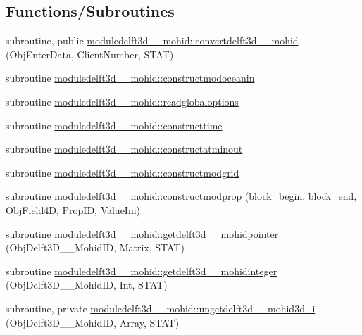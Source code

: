 \subsection*{Functions/\+Subroutines}
\begin{DoxyCompactItemize}
\item 
subroutine, public \mbox{\hyperlink{namespacemoduledelft3d__2__mohid_a03b75d6d9aec2bf65fd05cc9aaec61ab}{moduledelft3d\+\_\+\_\+mohid\+::convertdelft3d\+\_\+\_\+mohid}} (Obj\+Enter\+Data, Client\+Number, S\+T\+AT)
\item 
subroutine \mbox{\hyperlink{namespacemoduledelft3d__2__mohid_ab33b3699f757f82a3a7ef54bc7cc7061}{moduledelft3d\+\_\+\_\+mohid\+::constructmodoceanin}}
\item 
subroutine \mbox{\hyperlink{namespacemoduledelft3d__2__mohid_aa82a4835cdddf9eddf65ba75c51cff92}{moduledelft3d\+\_\+\_\+mohid\+::readglobaloptions}}
\item 
subroutine \mbox{\hyperlink{namespacemoduledelft3d__2__mohid_a6272b392fbc31727600ca81ee8fe5d43}{moduledelft3d\+\_\+\_\+mohid\+::constructtime}}
\item 
subroutine \mbox{\hyperlink{namespacemoduledelft3d__2__mohid_a7da2fd030b83e9111c17fd1699358aea}{moduledelft3d\+\_\+\_\+mohid\+::constructatminout}}
\item 
subroutine \mbox{\hyperlink{namespacemoduledelft3d__2__mohid_aff52824d2be1932406d107d88fa23498}{moduledelft3d\+\_\+\_\+mohid\+::constructmodgrid}}
\item 
subroutine \mbox{\hyperlink{namespacemoduledelft3d__2__mohid_a39e0d7490596c9b34419ca060790d641}{moduledelft3d\+\_\+\_\+mohid\+::constructmodprop}} (block\+\_\+begin, block\+\_\+end, Obj\+Field4D, Prop\+ID, Value\+Ini)
\item 
subroutine \mbox{\hyperlink{namespacemoduledelft3d__2__mohid_a13721b790965b5497115a3fa554de497}{moduledelft3d\+\_\+\_\+mohid\+::getdelft3d\+\_\+\_\+mohidpointer}} (Obj\+Delft3\+D\+\_\+\_\+\+Mohid\+ID, Matrix, S\+T\+AT)
\item 
subroutine \mbox{\hyperlink{namespacemoduledelft3d__2__mohid_a5500fdcc30972ef82a49b8924a5a44fe}{moduledelft3d\+\_\+\_\+mohid\+::getdelft3d\+\_\+\_\+mohidinteger}} (Obj\+Delft3\+D\+\_\+\_\+\+Mohid\+ID, Int, S\+T\+AT)
\item 
subroutine, private \mbox{\hyperlink{namespacemoduledelft3d__2__mohid_aa4cca39e63d47844aa594f71d019af8c}{moduledelft3d\+\_\+\_\+mohid\+::ungetdelft3d\+\_\+\_\+mohid3d\+\_\+i}} (Obj\+Delft3\+D\+\_\+\_\+\+Mohid\+ID, Array, S\+T\+AT)

\end{DoxyCompactItemize}
